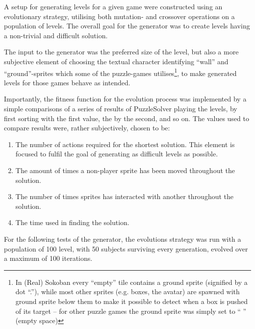 \documentclass[a4paper,titlepage,final]{report}
\begin{document}
A setup for generating levels for a given game were constructed using an evolutionary strategy, utilising both mutation- and crossover operations on a population of levels.
The overall goal for the generator was to create levels having a non-trivial and difficult solution.

The input to the generator was the preferred size of the level, but also a more subjective element of choosing the textual character identifying ``wall'' and ``ground''-sprites which some of the puzzle-games utilises\footnote{In (Real) Sokoban every ``empty'' tile contains a ground sprite (signified by a dot ``.''), while most other sprites (e.g. boxes, the avatar) are spawned with ground sprite below them to make it possible to detect when a box is pushed of its target -- for other puzzle games the ground sprite was simply set to `` '' (empty space)}, to make generated levels for those games behave as intended.

Importantly, the fitness function for the evolution process was implemented by a simple comparisons of a series of results of PuzzleSolver playing the levels, by first sorting with the first value, the by the second, and so on. 
The values used to compare results were, rather subjectively, chosen to be:

\begin{enumerate}
\item The number of actions required for the shortest solution. This element is focused to fulfil the goal of generating as difficult levels as possible.
\item The amount of times a non-player sprite has been moved throughout the solution.
\item The number of times sprites has interacted with another throughout the solution.
\item The time used in finding the solution.
\end{enumerate}

For the following tests of the generator, the evolutions strategy was run with a population of 100 level, with 50 subjects surviving every generation, evolved over a maximum of 100 iterations.



\end{document}
